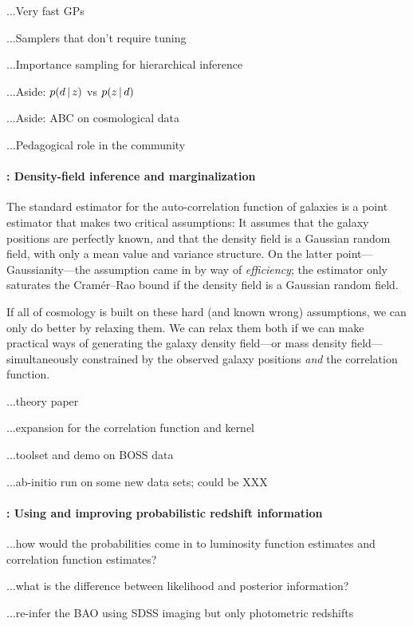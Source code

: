 \documentclass[12pt]{article}
\begin{document}
...Very fast GPs

...Samplers that don't require tuning

...Importance sampling for hierarchical inference

...Aside:  $p(d\,|\, z)$ vs $p(z\,|\, d)$

...Aside:  ABC on cosmological data

...Pedagogical role in the community

\paragraph{: Density-field inference and marginalization}

The standard estimator for the auto-correlation function of galaxies
is a point estimator that makes two critical assumptions:
It assumes that the galaxy positions are perfectly known, and that the
density field is a Gaussian random field, with only a mean value and
variance structure.
On the latter point---Gaussianity---the assumption came in by way of
\emph{efficiency}; the estimator only saturates the Cram\'er--Rao
bound if the density field is a Gaussian random field.

If all of cosmology is built on these hard (and known wrong)
assumptions, we can only do better by relaxing them.
We can relax them both if we can make practical ways of generating the
galaxy density field---or mass density field---simultaneously
constrained by the observed galaxy positions \emph{and} the
correlation function.

...theory paper

...expansion for the correlation function and kernel

...toolset and demo on BOSS data

...ab-initio run on some new data sets; could be XXX

\paragraph{: Using and improving probabilistic redshift information}

...how would the probabilities come in to luminosity function estimates and correlation function estimates?

...what is the difference between likelihood and posterior information?

...re-infer the BAO using SDSS imaging but only photometric redshifts
\end{document}
